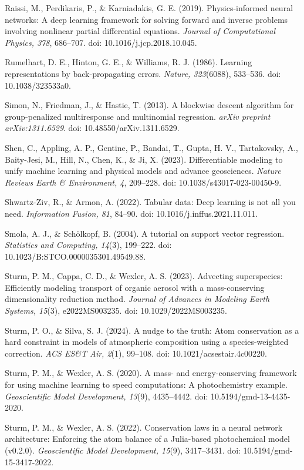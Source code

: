 \documentclass[a4paper,fleqn]{cas-sc}
\begin{document}
\noindent Raissi, M., Perdikaris, P., \& Karniadakis, G. E. (2019). Physics-informed neural networks: A deep learning framework for solving forward and inverse problems involving nonlinear partial differential equations. \textit{Journal of Computational Physics, 378}, 686--707. doi: 10.1016/j.jcp.2018.10.045.

\noindent Rumelhart, D. E., Hinton, G. E., \& Williams, R. J. (1986). Learning representations by back-propagating errors. \textit{Nature, 323}(6088), 533--536. doi: 10.1038/323533a0.

\noindent Simon, N., Friedman, J., \& Hastie, T. (2013). A blockwise descent algorithm for group-penalized multiresponse and multinomial regression. \textit{arXiv preprint arXiv:1311.6529}. doi: 10.48550/arXiv.1311.6529.

\noindent Shen, C., Appling, A. P., Gentine, P., Bandai, T., Gupta, H. V., Tartakovsky, A., Baity-Jesi, M., Hill, N., Chen, K., \& Ji, X. (2023). Differentiable modeling to unify machine learning and physical models and advance geosciences. \textit{Nature Reviews Earth \& Environment, 4}, 209--228. doi: 10.1038/s43017-023-00450-9.

\noindent Shwartz-Ziv, R., \& Armon, A. (2022). Tabular data: Deep learning is not all you need. \textit{Information Fusion, 81}, 84--90. doi: 10.1016/j.inffus.2021.11.011.

\noindent Smola, A. J., \& Sch\"olkopf, B. (2004). A tutorial on support vector regression. \textit{Statistics and Computing, 14}(3), 199--222. doi: 10.1023/B:STCO.0000035301.49549.88.

\noindent Sturm, P. M., Cappa, C. D., \& Wexler, A. S. (2023). Advecting superspecies: Efficiently modeling transport of organic aerosol with a mass-conserving dimensionality reduction method. \textit{Journal of Advances in Modeling Earth Systems, 15}(3), e2022MS003235. doi: 10.1029/2022MS003235.

\noindent Sturm, P. O., \& Silva, S. J. (2024). A nudge to the truth: Atom conservation as a hard constraint in models of atmospheric composition using a species-weighted correction. \textit{ACS ES\&T Air, 2}(1), 99--108. doi: 10.1021/acsestair.4c00220.

\noindent Sturm, P. M., \& Wexler, A. S. (2020). A mass- and energy-conserving framework for using machine learning to speed computations: A photochemistry example. \textit{Geoscientific Model Development, 13}(9), 4435--4442. doi: 10.5194/gmd-13-4435-2020.

\noindent Sturm, P. M., \& Wexler, A. S. (2022). Conservation laws in a neural network architecture: Enforcing the atom balance of a Julia-based photochemical model (v0.2.0). \textit{Geoscientific Model Development, 15}(9), 3417--3431. doi: 10.5194/gmd-15-3417-2022.
\end{document}
